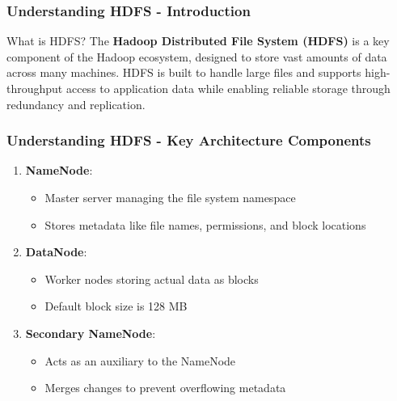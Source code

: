\documentclass[aspectratio=169]{beamer}
\begin{document}
\begin{frame}[fragile]
    \frametitle{Understanding HDFS - Introduction}
    \begin{block}{What is HDFS?}
        The \textbf{Hadoop Distributed File System (HDFS)} is a key component of the Hadoop ecosystem, designed to store vast amounts of data across many machines. HDFS is built to handle large files and supports high-throughput access to application data while enabling reliable storage through redundancy and replication.
    \end{block}
\end{frame}

\begin{frame}[fragile]
    \frametitle{Understanding HDFS - Key Architecture Components}
    \begin{enumerate}
        \item \textbf{NameNode}:
        \begin{itemize}
            \item Master server managing the file system namespace
            \item Stores metadata like file names, permissions, and block locations
        \end{itemize}

        \item \textbf{DataNode}:
        \begin{itemize}
            \item Worker nodes storing actual data as blocks
            \item Default block size is 128 MB
        \end{itemize}

        \item \textbf{Secondary NameNode}:
        \begin{itemize}
            \item Acts as an auxiliary to the NameNode
            \item Merges changes to prevent overflowing metadata
        \end{itemize}
    \end{enumerate}
\end{frame}
\end{document}
